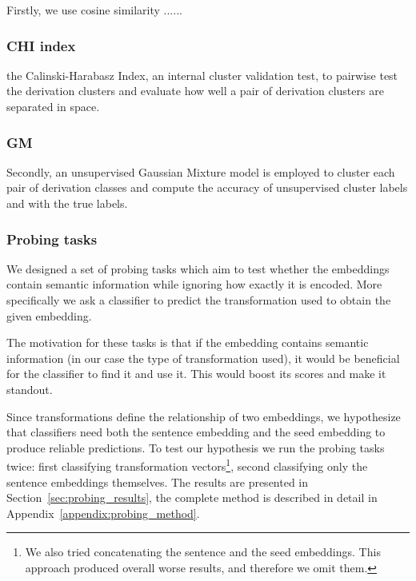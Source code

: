 \documentclass[11pt]{article}
\begin{document}
Firstly, we use cosine similarity ......

\subsubsection{CHI index}

the Calinski-Harabasz Index, an internal cluster validation test, to pairwise
test the derivation clusters and evaluate how well a pair of derivation
clusters are separated in space.

\subsubsection{GM}

Secondly, an unsupervised Gaussian Mixture model is employed to cluster each
pair of derivation classes and compute the accuracy of unsupervised cluster
labels and with the true labels.



\subsubsection{Probing tasks}

We designed a set of probing tasks which aim to test whether the embeddings
contain semantic information while ignoring how exactly it is encoded. More
specifically we ask a classifier to predict the transformation used to obtain
the given embedding.

The motivation for these tasks is that if the embedding contains semantic
information (in our case the type of transformation used), it would be
beneficial for the classifier to find it and use it. This would boost its
scores and make it standout.

Since transformations define the relationship of two embeddings, we hypothesize
that classifiers need both the sentence embedding and the seed embedding to
produce reliable predictions. To test our hypothesis we run the probing tasks
twice: first classifying transformation vectors\footnote{We also tried
concatenating the sentence and the seed embeddings. This approach produced
overall worse results, and therefore we omit them.}, second classifying only
the sentence embeddings themselves. The results are presented in
Section~\ref{sec:probing_results}, the complete method is described in detail
in Appendix~\ref{appendix:probing_method}.
\end{document}
